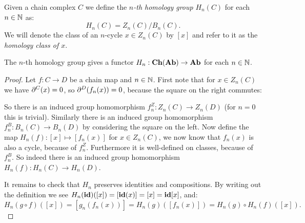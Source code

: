 \begin{definition}
	Given a chain complex $C$ we define the \emph{$n$-th homology group} $H_n(C)$ for each $n \in \mathbb{N}$ as:
	$$ H_n(C) = Z_n(C) / B_n(C).$$
	We will denote the class of an $n$-cycle $x \in Z_n(C)$ by $[x]$ and refer to it as the \emph{homology class of $x$}.
\end{definition}
\begin{lemma}
	The $n$-th homology group gives a functor $H_n : \mathbf{Ch}(\mathbf{Ab}) \to \mathbf{Ab}$ for each $n \in \mathbb{N}$.
\end{lemma}
\begin{proof}
	Let $f: C \to D$ be a chain map and $n \in \mathbb{N}$. First note that for $x \in Z_n(C)$ we have $\partial^C(x) = 0$, so $\partial^D(f_n(x)) = 0$, because the square on the right commutes:

	{\centering
	\par}

	So there is an induced group homomorphism $f^Z_n : Z_n(C) \to Z_n(D)$ (for $n=0$ this is trivial). Similarly there is an induced group homomorphism $f^B_n : B_n(C) \to B_n(D)$ by considering the square on the left. Now define the map $H_n(f) : [x] \mapsto [f_n(x)]$ for $x \in Z_n(C)$, we now know that $f_n(x)$ is also a cycle, because of $f^Z_n$. Furthermore it is well-defined on classes, because of $f^B_n$. So indeed there is an induced group homomorphism $H_n(f) : H_n(C) \to H_n(D)$.

	It remains to check that $H_n$ preserves identities and compositions. By writing out the definition we see $H_n(\mathbf{id})([x]) = [\mathbf{id}(x)] = [x] = \mathbf{id}[x]$, and:
	$$ H_n(g \circ f)([x]) = [g_n(f_n(x))] = H_n(g)([f_n(x)]) = H_n(g) \circ H_n(f) ([x]). $$
\end{proof}

